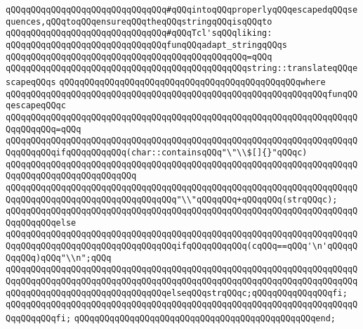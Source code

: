 \verb|qQQqqQQqqQQqqQQqqQQqqQQqqQQqqQQq#qQQqintoqQQqproperlyqQQqescapedqQQqsequences,qQQqtoqQQqensureqQQqtheqQQqstringqQQqisqQQqto|\newline
\verb|qQQqqQQqqQQqqQQqqQQqqQQqqQQqqQQq#qQQqTcl'sqQQqliking:|\newline
\newline
\verb|qQQqqQQqqQQqqQQqqQQqqQQqqQQqqQQqfunqQQqadapt_stringqQQqs|\newline
\verb|qQQqqQQqqQQqqQQqqQQqqQQqqQQqqQQqqQQqqQQqqQQqqQQq=qQQq|\newline
\verb|qQQqqQQqqQQqqQQqqQQqqQQqqQQqqQQqqQQqqQQqqQQqqQQqstring::translateqQQqescapeqQQqs|\newline
\verb|qQQqqQQqqQQqqQQqqQQqqQQqqQQqqQQqqQQqqQQqqQQqqQQqwhere|\newline
\verb|qQQqqQQqqQQqqQQqqQQqqQQqqQQqqQQqqQQqqQQqqQQqqQQqqQQqqQQqqQQqqQQqfunqQQqescapeqQQqc|\newline
\verb|qQQqqQQqqQQqqQQqqQQqqQQqqQQqqQQqqQQqqQQqqQQqqQQqqQQqqQQqqQQqqQQqqQQqqQQqqQQqqQQq=qQQq|\newline
\verb|qQQqqQQqqQQqqQQqqQQqqQQqqQQqqQQqqQQqqQQqqQQqqQQqqQQqqQQqqQQqqQQqqQQqqQQqqQQqqQQqifqQQqqQQqqQQq(char::containsqQQq"\"\\$[]{}"qQQqc)|\newline
\verb|qQQqqQQqqQQqqQQqqQQqqQQqqQQqqQQqqQQqqQQqqQQqqQQqqQQqqQQqqQQqqQQqqQQqqQQqqQQqqQQqqQQqqQQqqQQqqQQq|\newline
\verb|qQQqqQQqqQQqqQQqqQQqqQQqqQQqqQQqqQQqqQQqqQQqqQQqqQQqqQQqqQQqqQQqqQQqqQQqqQQqqQQqqQQqqQQqqQQqqQQqqQQqqQQq"\\"qQQqqQQq+qQQqqQQq(strqQQqc);|\newline
\verb|qQQqqQQqqQQqqQQqqQQqqQQqqQQqqQQqqQQqqQQqqQQqqQQqqQQqqQQqqQQqqQQqqQQqqQQqqQQqqQQqelse|\newline
\verb|qQQqqQQqqQQqqQQqqQQqqQQqqQQqqQQqqQQqqQQqqQQqqQQqqQQqqQQqqQQqqQQqqQQqqQQqqQQqqQQqqQQqqQQqqQQqqQQqqQQqqQQqifqQQqqQQqqQQq(cqQQq==qQQq'\n'qQQqqQQqqQQq)qQQq"\\n";qQQq|\newline
\verb|qQQqqQQqqQQqqQQqqQQqqQQqqQQqqQQqqQQqqQQqqQQqqQQqqQQqqQQqqQQqqQQqqQQqqQQqqQQqqQQqqQQqqQQqqQQqqQQqqQQqqQQqqQQqqQQqqQQqqQQqqQQqqQQqqQQqqQQqqQQqqQQqqQQqqQQqqQQqqQQqqQQqqQQqqQQqelseqQQqstrqQQqc;qQQqqQQqqQQqqQQqfi;|\newline
\verb|qQQqqQQqqQQqqQQqqQQqqQQqqQQqqQQqqQQqqQQqqQQqqQQqqQQqqQQqqQQqqQQqqQQqqQQqqQQqqQQqfi;|\newline
\verb|qQQqqQQqqQQqqQQqqQQqqQQqqQQqqQQqqQQqqQQqqQQqqQQqend;|\newline
